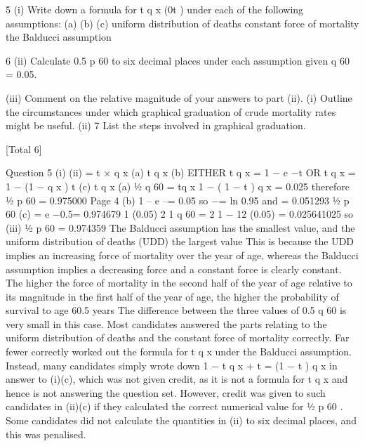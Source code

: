 \documentclass[a4paper,12pt]{article}
\begin{document}
\begin{enumerate}
[6]5
(i)
Write down a formula for t q x (0\leq t ) under each of the following
assumptions:
(a)
(b)
(c)
uniform distribution of deaths
constant force of mortality
the Balducci assumption

6
(ii) Calculate 0.5 p 60 to six decimal places under each assumption given q 60 = 0.05.

(iii) Comment on the relative magnitude of your answers to part (ii).
(i) Outline the circumstances under which graphical graduation of crude
mortality rates might be useful.
(ii)
7
List the steps involved in graphical graduation.

[Total 6]



\newpage
Question 5
(i)
(ii)
= t × q x
(a) t q x
(b) EITHER t q x = 1 − e −\mu t OR t q x = 1 − (1 − q x ) t
(c) t q x
(a) 1⁄2 q 60
=
tq x
1 − ( 1 − t ) q x
= 0.025
therefore 1⁄2 p 60 = 0.975000
Page 4 %
(b)
1 – e –\mu = 0.05
so −\mu = ln 0.95 and \mu = 0.051293
1⁄2 p 60
(c)
= e −0.5\mu = 0.974679
1 (0.05)
2
1 q 60 =
2
1 − 12 (0.05)
= 0.025641025
so
(iii)
1⁄2 p 60
= 0.974359
The Balducci assumption has the smallest value, and the uniform distribution of
deaths (UDD) the largest value
This is because the UDD implies an increasing force of mortality over the year of age,
whereas the Balducci assumption implies a decreasing force and a constant force is
clearly constant.
The higher the force of mortality in the second half of the year of age relative to its
magnitude in the first half of the year of age, the higher the probability of survival to
age 60.5 years
The difference between the three values of
0.5
q 60 is very small in this case.
Most candidates answered the parts relating to the uniform distribution of deaths and the
constant force of mortality correctly. Far fewer correctly worked out the formula for
t q x under the Balducci assumption. Instead, many candidates simply wrote down
1 − t q x + t = (1 − t ) q x in answer to (i)(c), which was not given credit, as it is not a formula for
t q x and hence is not answering the question set. However, credit was given to such
candidates in (ii)(c) if they calculated the correct numerical value for 1⁄2 p 60 . Some candidates
did not calculate the quantities in (ii) to six decimal places, and this was penalised.


\end{enumerate}
\end{document}
